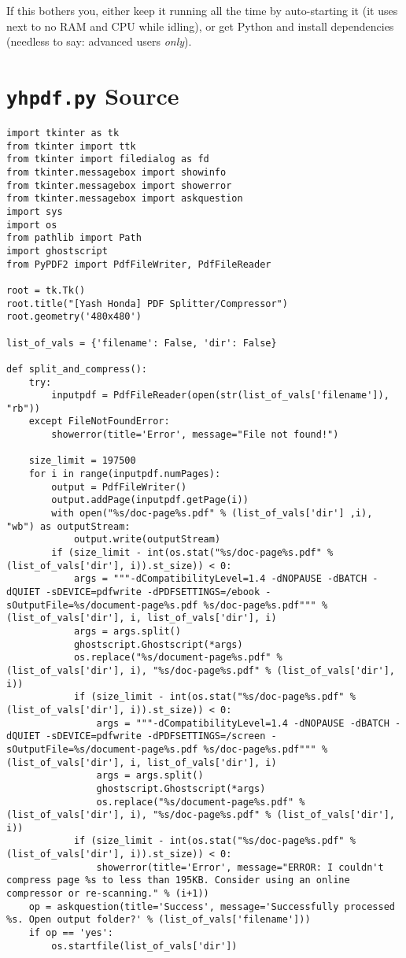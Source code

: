 \documentclass[9pt]{report}
\begin{document}
If this bothers you, either keep it running all the time by
auto-starting it (it uses next to no RAM and CPU while idling), or
get Python and install dependencies (needless to say: advanced
users \emph{only}).

\chapter{\texttt{yhpdf.py} Source}
\label{sec:org574b3c5}

\begin{verbatim}
import tkinter as tk
from tkinter import ttk
from tkinter import filedialog as fd
from tkinter.messagebox import showinfo
from tkinter.messagebox import showerror
from tkinter.messagebox import askquestion
import sys
import os
from pathlib import Path
import ghostscript
from PyPDF2 import PdfFileWriter, PdfFileReader

root = tk.Tk()
root.title("[Yash Honda] PDF Splitter/Compressor")
root.geometry('480x480')

list_of_vals = {'filename': False, 'dir': False}

def split_and_compress():
    try:
        inputpdf = PdfFileReader(open(str(list_of_vals['filename']), "rb"))
    except FileNotFoundError:
        showerror(title='Error', message="File not found!")

    size_limit = 197500
    for i in range(inputpdf.numPages):
        output = PdfFileWriter()
        output.addPage(inputpdf.getPage(i))
        with open("%s/doc-page%s.pdf" % (list_of_vals['dir'] ,i), "wb") as outputStream:
            output.write(outputStream)
        if (size_limit - int(os.stat("%s/doc-page%s.pdf" % (list_of_vals['dir'], i)).st_size)) < 0:
            args = """-dCompatibilityLevel=1.4 -dNOPAUSE -dBATCH -dQUIET -sDEVICE=pdfwrite -dPDFSETTINGS=/ebook -sOutputFile=%s/document-page%s.pdf %s/doc-page%s.pdf""" % (list_of_vals['dir'], i, list_of_vals['dir'], i)
            args = args.split()
            ghostscript.Ghostscript(*args)
            os.replace("%s/document-page%s.pdf" % (list_of_vals['dir'], i), "%s/doc-page%s.pdf" % (list_of_vals['dir'], i))
            if (size_limit - int(os.stat("%s/doc-page%s.pdf" % (list_of_vals['dir'], i)).st_size)) < 0:
                args = """-dCompatibilityLevel=1.4 -dNOPAUSE -dBATCH -dQUIET -sDEVICE=pdfwrite -dPDFSETTINGS=/screen -sOutputFile=%s/document-page%s.pdf %s/doc-page%s.pdf""" % (list_of_vals['dir'], i, list_of_vals['dir'], i)
                args = args.split()
                ghostscript.Ghostscript(*args)
                os.replace("%s/document-page%s.pdf" % (list_of_vals['dir'], i), "%s/doc-page%s.pdf" % (list_of_vals['dir'], i))
            if (size_limit - int(os.stat("%s/doc-page%s.pdf" % (list_of_vals['dir'], i)).st_size)) < 0:
                showerror(title='Error', message="ERROR: I couldn't compress page %s to less than 195KB. Consider using an online compressor or re-scanning." % (i+1))
    op = askquestion(title='Success', message='Successfully processed %s. Open output folder?' % (list_of_vals['filename']))
    if op == 'yes':
        os.startfile(list_of_vals['dir'])


\end{verbatim}
\end{document}
